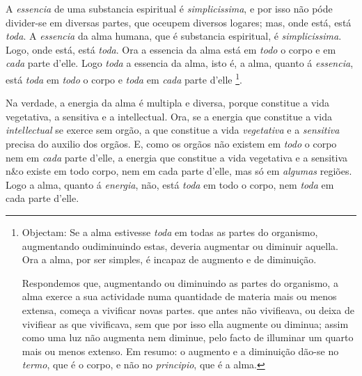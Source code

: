 A \emph{essencia} de uma substancia espiritual é \emph{simplicissima}, e por isso não póde divider-se em diversas partes, que oceupem diversos logares; mas, onde está, está \emph{toda}. A \emph{essencia} da alma humana, que é substancia espiritual, é \emph{simplicissima}. Logo, onde está, está \emph{toda}. Ora a essencia da alma está em \emph{todo} o corpo e em \emph{cada} parte d'elle. Logo \emph{toda} a essencia da alma, isto é, a alma, quanto á \emph{essencia}, está \emph{toda} em \emph{todo} o corpo e \emph{toda} em \emph{cada} parte d'elle \footnote{Objectam: Se a alma estivesse \emph{toda} em todas as partes do organismo, augmentando oudiminuindo estas, deveria augmentar ou diminuir aquella. Ora a alma, por ser simples, é incapaz de augmento e de diminuição.\par Respondemos que, augmentando ou diminuindo as partes do organismo, a alma exerce a sua actividade numa quantidade de materia mais ou menos extensa, começa a vivificar novas partes. que antes não vivifieava, ou deixa de vivifiear as que vivificava, sem que por isso ella augmente ou diminua; assim como uma luz não augmenta nem diminue, pelo facto de illuminar um quarto mais ou menos extenso. Em resumo: o augmento e a diminuição dão-se no \emph{termo}, que é o corpo, e não no \emph{principio}, que é a alma.}.


Na verdade, a energia da alma é multipla e diversa, porque constitue a vida vegetativa, a sensitiva e a intellectual. Ora, se a energia que constitue a vida \emph{intellectual} se exerce sem orgão, a que constitue a vida \emph{vegetativa} e a \emph{sensitiva} precisa do auxilio dos orgãos. E, como os orgãos não existem em \emph{todo} o corpo nem em \emph{cada} parte d'elle, a energia que constitue a vida vegetativa e a   sensitiva n\&o existe em todo corpo, nem em cada parte d'elle, mas só em \emph{algumas} regiões. Logo a alma, quanto á \emph{energia}, não, está \emph{toda} em todo o corpo, nem \emph{toda} em cada parte d'elle.

